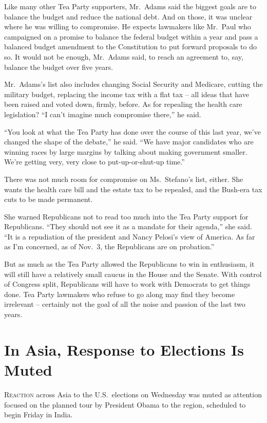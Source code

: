 ﻿\documentclass[12pt]{article}
\begin{document}
Like many other Tea Party supporters, Mr.~Adams said the biggest goals are to balance the budget and
reduce the national debt. And on those, it was unclear where he was willing to compromise. He
expects lawmakers like Mr.~Paul who campaigned on a promise to balance the federal budget within a
year and pass a balanced budget amendment to the Constitution to put forward proposals to do so. It
would not be enough, Mr.~Adams said, to reach an agreement to, say, balance the budget over five
years.

Mr.~Adams's list also includes changing Social Security and Medicare, cutting the military budget,
replacing the income tax with a flat tax -- all ideas that have been raised and voted down, firmly,
before. As for repealing the health care legislation? ``I can't imagine much compromise there,'' he
said.

``You look at what the Tea Party has done over the course of this last year, we've changed the shape
of the debate,'' he said. ``We have major candidates who are winning races by large margins by
talking about making government smaller. We're getting very, very close to put-up-or-shut-up time.''

There was not much room for compromise on Ms.~Stefano's list, either. She wants the health care bill
and the estate tax to be repealed, and the Bush-era tax cuts to be made permanent.

She warned Republicans not to read too much into the Tea Party support for Republicans. ``They
should not see it as a mandate for their agenda,'' she said. ``It is a repudiation of the president
and Nancy Pelosi's view of America. As far as I'm concerned, as of Nov.~3, the Republicans are on
probation.''

But as much as the Tea Party allowed the Republicans to win in enthusiasm, it will still have a
relatively small caucus in the House and the Senate. With control of Congress split, Republicans
will have to work with Democrats to get things done. Tea Party lawmakers who refuse to go along may
find they become irrelevant -- certainly not the goal of all the noise and passion of the last two
years.

\section{In Asia, Response to Elections Is Muted}

\lettrine{R}{eaction} across Asia to the U.S.~elections on Wednesday was
muted as attention focused on the planned tour by President Obama to the region, scheduled to begin
Friday in India.
\end{document}
